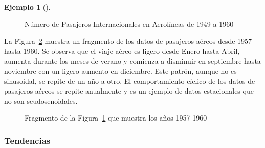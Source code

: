 \documentclass[
  us-letterpaper,
]{scrreprt}
\theoremstyle{plain}
\theoremstyle{definition}
\newtheorem{example}{Ejemplo}[chapter]
\theoremstyle{plain}
\theoremstyle{definition}
\theoremstyle{remark}
\begin{document}
\begin{example}[]
\begin{tcolorbox}
\begin{figure}[H]
{}

\caption{\label{fig-airpass}Número de Pasajeros Internacionales en
Aerolíneas de 1949 a 1960}

\end{figure}%

La Figura~\ref{fig-airfrag} muestra un fragmento de los datos de
pasajeros aéreos desde 1957 hasta 1960. Se observa que el viaje aéreo es
ligero desde Enero hasta Abril, aumenta durante los meses de verano y
comienza a disminuir en septiembre hasta noviembre con un ligero aumento
en diciembre. Este patrón, aunque no es sinusoidal, se repite de un año
a otro. El comportamiento cíclico de los datos de pasajeros aéreos se
repite anualmente y es un ejemplo de datos estacionales que no son
seudosenoidales.

\begin{figure}[H]


\caption{\label{fig-airfrag}Fragmento de la Figura~\ref{fig-airpass} que
muestra los años 1957-1960}

\end{figure}%

\end{tcolorbox}

\end{example}

\subsubsection{Tendencias}\label{sec-trend}
\end{document}
